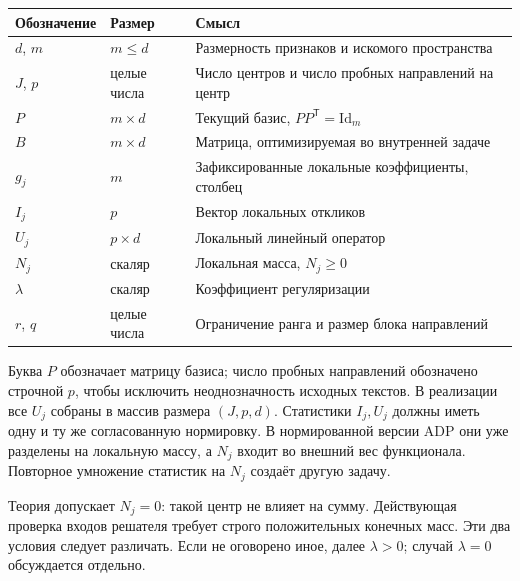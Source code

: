 \documentclass[11pt,a4paper]{article}
\numberwithin{equation}{section}
\theoremstyle{remark}
\newcommand{\Id}{\mathrm{Id}}
\newcommand{\T}{^{\mathsf T}}
\begin{document}
\begin{center}
\begin{tabularx}{\linewidth}{@{}l l X@{}}
\toprule
Обозначение & Размер & Смысл\\
\midrule
$d$, $m$ & $m\le d$ & Размерность признаков и искомого пространства\\
$J$, $p$ & целые числа & Число центров и число пробных направлений на центр\\
$P$ & $m\times d$ & Текущий базис, $PP\T=\Id_m$\\
$B$ & $m\times d$ & Матрица, оптимизируемая во внутренней задаче\\
$g_j$ & $m$ & Зафиксированные локальные коэффициенты, столбец\\
$I_j$ & $p$ & Вектор локальных откликов\\
$U_j$ & $p\times d$ & Локальный линейный оператор\\
$N_j$ & скаляр & Локальная масса, $N_j\ge0$\\
$\lambda$ & скаляр & Коэффициент регуляризации\\
$r$, $q$ & целые числа & Ограничение ранга и размер блока направлений\\
\bottomrule
\end{tabularx}
\end{center}

Буква $P$ обозначает матрицу базиса; число пробных направлений обозначено
строчной $p$, чтобы исключить неоднозначность исходных текстов.
В реализации все $U_j$ собраны в массив размера $(J,p,d)$.
Статистики $I_j,U_j$ должны иметь одну и ту же согласованную нормировку.
В нормированной версии ADP они уже разделены на локальную массу, а $N_j$
входит во внешний вес функционала. Повторное умножение статистик на $N_j$
создаёт другую задачу.

Теория допускает $N_j=0$: такой центр не влияет на сумму. Действующая
проверка входов решателя требует строго положительных конечных масс.
Эти два условия следует различать. Если не оговорено иное, далее
$\lambda>0$; случай $\lambda=0$ обсуждается отдельно.
\end{document}
